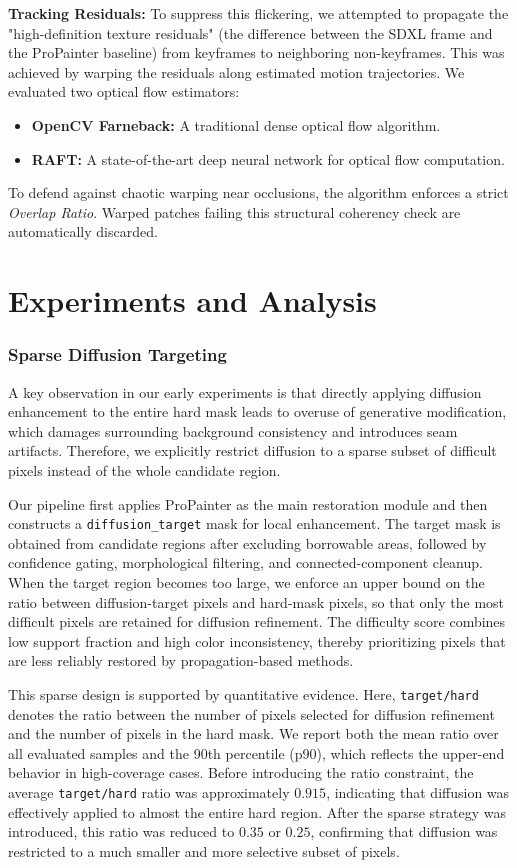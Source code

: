 \documentclass[10pt,twocolumn,letterpaper]{article}
\begin{document}
\textbf{Tracking Residuals:} To suppress this flickering, we attempted to propagate the "high-definition texture residuals" (the difference between the SDXL frame and the ProPainter baseline) from keyframes to neighboring non-keyframes. This was achieved by warping the residuals along estimated motion trajectories. We evaluated two optical flow estimators:
\begin{itemize}
    \item \textbf{OpenCV Farneback:} A traditional dense optical flow algorithm.
    \item \textbf{RAFT:} A state-of-the-art deep neural network for optical flow computation.
\end{itemize}
To defend against chaotic warping near occlusions, the algorithm enforces a strict \textit{Overlap Ratio}. Warped patches failing this structural coherency check are automatically discarded.

\section{Experiments and Analysis}

\subsubsection{Sparse Diffusion Targeting}

A key observation in our early experiments is that directly applying diffusion enhancement to the entire hard mask leads to overuse of generative modification, which damages surrounding background consistency and introduces seam artifacts.
Therefore, we explicitly restrict diffusion to a sparse subset of difficult pixels instead of the whole candidate region.

Our pipeline first applies ProPainter as the main restoration module and then constructs a \texttt{diffusion\_target} mask for local enhancement.
The target mask is obtained from candidate regions after excluding borrowable areas, followed by confidence gating, morphological filtering, and connected-component cleanup.
When the target region becomes too large, we enforce an upper bound on the ratio between diffusion-target pixels and hard-mask pixels, so that only the most difficult pixels are retained for diffusion refinement.
The difficulty score combines low support fraction and high color inconsistency, thereby prioritizing pixels that are less reliably restored by propagation-based methods.

This sparse design is supported by quantitative evidence.
Here, \texttt{target/hard} denotes the ratio between the number of pixels selected for diffusion refinement and the number of pixels in the hard mask.
We report both the mean ratio over all evaluated samples and the 90th percentile (p90), which reflects the upper-end behavior in high-coverage cases.
Before introducing the ratio constraint, the average \texttt{target/hard} ratio was approximately \(0.915\), indicating that diffusion was effectively applied to almost the entire hard region.
After the sparse strategy was introduced, this ratio was reduced to \(0.35\) or \(0.25\), confirming that diffusion was restricted to a much smaller and more selective subset of pixels.
\end{document}
